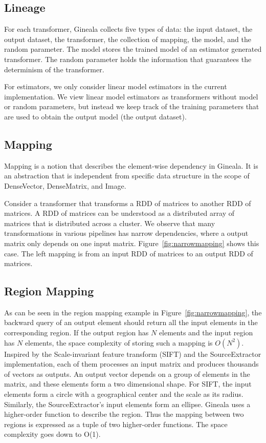 \documentclass{sig-alternate}
\begin{document}
\subsection{Lineage}
\label{sec:Design-Lineage}
For each transformer, Gineala collects five types of data: the input dataset, the output dataset, the transformer, the collection of mapping, the model, and the random parameter.
The model stores the trained model of an estimator generated transformer.
The random parameter holds the information that guarantees the determinism of the transformer.

For estimators, we only consider linear model estimators in the current implementation. 
We view linear model estimators as transformers without model or random parameters, 
but instead we keep track of the training parameters that are used to obtain the output model (the output dataset). 

\subsection{Mapping}
\label{sec:Design-Mapping}
Mapping is a notion that describes the element-wise dependency in Gineala. 
It is an abstraction that is independent from specific data structure in the scope of DenseVector, DenseMatrix, and Image.

Consider a transformer that transforms a RDD of matrices to another RDD of matrices.
A RDD of matrices can be understood as a distributed array of matrices that is distributed across a cluster.
We observe that many transformations in various pipelines has narrow dependencies, where a output matrix
only depends on one input matrix. Figure~\ref{fig:narrowmapping} shows this case. 
The left mapping is from an input RDD of matrices to an output RDD of matrices. 




\subsection{Region Mapping}
\label{sec:Design-RegionMapping}
As can be seen in the region mapping example in Figure~\ref{fig:narrowmapping}, the backward query of an output element should return all the input elements in the corresponding region. If the output region has $N$ elements and the input region has $N$ elements, the space complexity of storing such a mapping is $O(N^2)$. 
Inspired by the Scale-invariant feature transform (SIFT) and the SourceExtractor implementation, each of them processes an input matrix and produces thousands of vectors as outputs. An output vector depends on a group of elements in the matrix, and these elements form a two dimensional shape. 
For SIFT, the input elements form a circle with a geographical center and the scale as its radius.
Similarly, the SourceExtractor's input elements  form an ellipse. 
Gineala uses a higher-order function to describe the region. 
Thus the mapping between two regions is expressed as a tuple of two higher-order functions.
The space complexity goes down to O(1).
\end{document}
